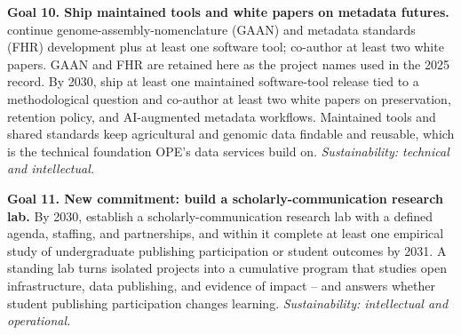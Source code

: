 \textbf{Goal 10. Ship maintained tools and white papers on metadata futures.}  continue genome-assembly-nomenclature (GAAN) and metadata standards (FHR) development plus at least one software tool; co-author at least two white papers. GAAN and FHR are retained here as the project names used in the 2025 record. By 2030, ship at least one maintained software-tool release tied to a methodological question and co-author at least two white papers on preservation, retention policy, and AI-augmented metadata workflows. Maintained tools and shared standards keep agricultural and genomic data findable and reusable, which is the technical foundation OPE's data services build on. \textit{Sustainability: technical and intellectual.}

\textbf{Goal 11. New commitment: build a scholarly-communication research lab.} By 2030, establish a scholarly-communication research lab with a defined agenda, staffing, and partnerships, and within it complete at least one empirical study of undergraduate publishing participation or student outcomes by 2031. A standing lab turns isolated projects into a cumulative program that studies open infrastructure, data publishing, and evidence of impact -- and answers whether student publishing participation changes learning. \textit{Sustainability: intellectual and operational.}

\par\endgroup
